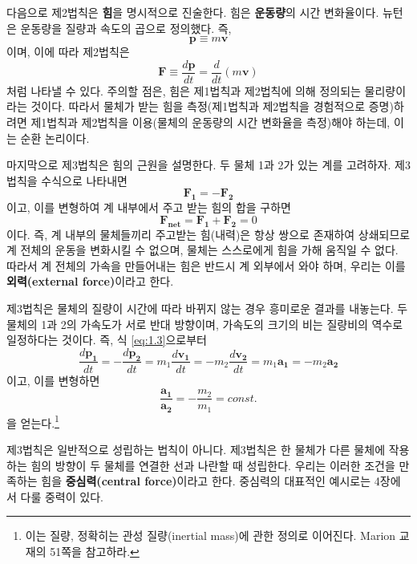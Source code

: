 \documentclass[chapter, oneside, b5paper]{oblivoir}
\theoremstyle{plain}
\theoremstyle{definition}
\theoremstyle{remark}
\begin{document}
다음으로 제2법칙은 \textbf{힘}을 명시적으로 진술한다. 힘은 \textbf{운동량}의 시간 변화율이다. 뉴턴은 운동량을 질량과 속도의 곱으로 정의했다. 즉,
\begin{equation}
    \mathbf{p} \equiv m\mathbf{v} \label{eq:1.1}
\end{equation}
이며, 이에 따라 제2법칙은
\begin{equation}
    \mathbf{F} \equiv \frac{d\mathbf{p}}{dt} = \frac{d}{dt}(m\mathbf{v}) \label{eq:1.2}
\end{equation}
처럼 나타낼 수 있다. 주의할 점은, 힘은 제1법칙과 제2법칙에 의해 정의되는 물리량이라는 것이다. 따라서 물체가 받는 힘을 측정(제1법칙과 제2법칙을 경험적으로 증명)하려면 제1법칙과 제2법칙을 이용(물체의 운동량의 시간 변화율을 측정)해야 하는데, 이는 순환 논리이다.

마지막으로 제3법칙은 힘의 근원을 설명한다. 두 물체 1과 2가 있는 계를 고려하자. 제3법칙을 수식으로 나타내면
\begin{equation}
    \mathbf{F_{1}} = -\mathbf{F_{2}} \label{eq:1.3}
\end{equation}
이고, 이를 변형하여 계 내부에서 주고 받는 힘의 합을 구하면
\begin{equation}
    \mathbf{F_{net}} = \mathbf{F_{1}} + \mathbf{F_{2}} = 0 \label{eq:1.4}
\end{equation}
이다. 즉, 계 내부의 물체들끼리 주고받는 힘(내력)은 항상 쌍으로 존재하여 상쇄되므로 계 전체의 운동을 변화시킬 수 없으며, 물체는 스스로에게 힘을 가해 움직일 수 없다. 따라서 계 전체의 가속을 만들어내는 힘은 반드시 계 외부에서 와야 하며, 우리는 이를 \textbf{외력(external force)}이라고 한다.

제3법칙은 물체의 질량이 시간에 따라 바뀌지 않는 경우 흥미로운 결과를 내놓는다. 두 물체의 1과 2의 가속도가 서로 반대 방향이며, 가속도의 크기의 비는 질량비의 역수로 일정하다는 것이다. 즉, 식 \ref{eq:1.3}으로부터
\begin{equation}
    \frac{d\mathbf{p_1}}{dt} = -\frac{d\mathbf{p_2}}{dt} = m_1\frac{d\mathbf{v_1}}{dt} = -m_2\frac{d\mathbf{v_2}}{dt} = m_1\mathbf{a_1} = -m_2\mathbf{a_2} \label{eq:1.5}
\end{equation}
이고, 이를 변형하면
\begin{equation}
    \frac{\mathbf{a_1}}{\mathbf{a_2}} = -\frac{m_2}{m_1} = const. \label{eq:1.6}
\end{equation}
을 얻는다.\footnote{이는 질량, 정확히는 관성 질량(inertial mass)에 관한 정의로 이어진다. Marion 교재의 51쪽을 참고하라.}

제3법칙은 일반적으로 성립하는 법칙이 아니다. 제3법칙은 한 물체가 다른 물체에 작용하는 힘의 방향이 두 물체를 연결한 선과 나란할 때 성립한다. 우리는 이러한 조건을 만족하는 힘을 \textbf{중심력(central force)}이라고 한다. 중심력의 대표적인 예시로는 4장에서 다룰 중력이 있다.
\end{document}

